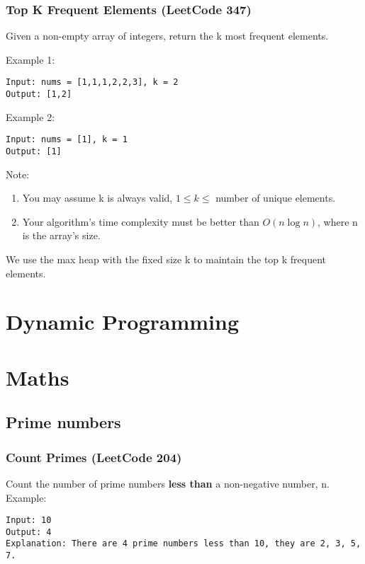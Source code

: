 \documentclass[11pt]{article}
\begin{document}
\inputminted[breaklines=true,frame=leftline, linenos=true]{python}{src/kthLargestInStream.py}


\subsubsection{Top K Frequent Elements (LeetCode 347)}

Given a non-empty array of integers, return the k most frequent elements.

Example 1:
\begin{verbatim}
Input: nums = [1,1,1,2,2,3], k = 2
Output: [1,2]
\end{verbatim}

Example 2:
\begin{verbatim}
Input: nums = [1], k = 1
Output: [1]
\end{verbatim}

Note:
\begin{enumerate}
	\item You may assume k is always valid, $1 \leq k \leq $ number of unique elements.
	\item Your algorithm's time complexity must be better than $O(n \log n)$, where n is the array's size.
\end{enumerate}

We use the max heap with the fixed size k to maintain the top k frequent elements. 





\section{Dynamic Programming}

\section{Maths}
\subsection{Prime numbers}
\subsubsection{Count Primes (LeetCode 204)}
Count the number of prime numbers \textbf{less than} a non-negative number, n.
Example:
\begin{verbatim}
Input: 10
Output: 4
Explanation: There are 4 prime numbers less than 10, they are 2, 3, 5, 7.
\end{verbatim}
\end{document}
